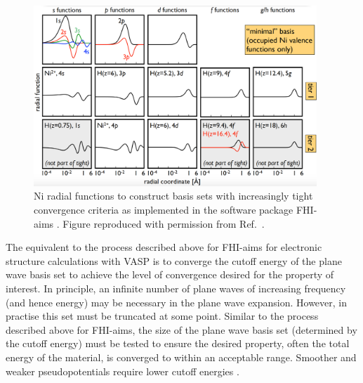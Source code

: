 \documentclass[11pt, twoside]{report}
\begin{document}
\begin{figure}[h!]
  \centering
    \includegraphics[width=0.95\textwidth]{figures/FHI-aims_tiers.png}
    \caption[Ni radial functions to construct basis sets with increasingly tight convergence criteria as implemented in the software package FHI-aims.]{Ni radial functions to construct basis sets with increasingly tight convergence criteria as implemented in the software package FHI-aims \cite{FHI-aims}. Figure reproduced with permission from Ref.~.}
  \label{FHI-aims_tiers}
\end{figure}

The equivalent to the process described above for FHI-aims for electronic structure calculations with VASP is to converge the cutoff energy of the plane wave basis set to achieve the level of convergence desired for the property of interest. In principle, an infinite number of plane waves of increasing frequency (and hence energy) may be necessary in the plane wave expansion. However, in practise this set must be truncated at some point. Similar to the process described above for FHI-aims, the size of the plane wave basis set (determined by the cutoff energy) must be tested to ensure the desired property, often the total energy of the material, is converged to within an acceptable range. Smoother and weaker pseudopotentials require lower cutoff energies \cite{Prasad_ch6}.
\end{document}
